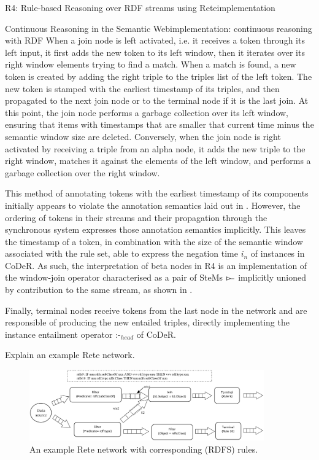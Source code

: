 \begin{nestedsection}{R4: Rule-based Reasoning over RDF streams using Rete}{implementation}
\begin{nestedsection}{Continuous Reasoning in the Semantic Web}{implementation: continuous reasoning with RDF}
		When a join node is left activated, i.e. it receives a token through its left input, it first adds the new token to its left window, then it iterates over its right window elements trying to find a match.
		When a match is found, a new token is created by adding the right triple to the triples list of the left token.
		The new token is stamped with the earliest timestamp of its triples, and then propagated to the next join node or to the terminal node if it is the last join.
		At this point, the join node performs a garbage collection over its left window, ensuring that items with timestamps that are smaller that current time minus the semantic window size are deleted.
		Conversely, when the join node is right activated by receiving a triple from an alpha node, it adds the new triple to the right window, matches it against the elements of the left window, and performs a garbage collection over the right window.

		This method of annotating tokens with the earliest timestamp of its components initially appears to violate the annotation semantics laid out in .
		However, the ordering of tokens in their streams and their propagation through the synchronous system expresses those annotation semantics implicitly.
		This leaves the timestamp of a token, in combination with the size of the semantic window associated with the rule set, able to express the negation time $i_n$ of instances in CoDeR.
		As such, the interpretation of beta nodes in R4 is an implementation of the window-join operator characterised as a pair of SteMs $\rstreamjoin$ implicitly unioned by contribution to the same stream, as shown in .

 		Finally, terminal nodes receive tokens from the last node in the network and are responsible of producing the new entailed triples, directly implementing the instance entailment operator $\text{:-}_{head}$ of CoDeR.

 		Explain an example Rete network.

 		\begin{figure}[t]
 			\centering
 			\includegraphics[width=0.9\textwidth]{example-rete-network.png}
 			\caption{An example Rete network with corresponding (RDFS) rules.}
 		\end{figure}
	\end{nestedsection}
\end{nestedsection}
